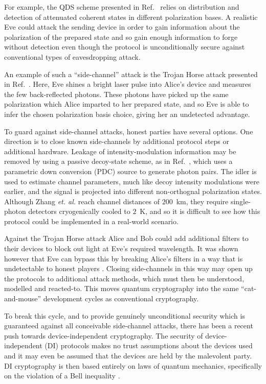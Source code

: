 For example, the QDS scheme presented in Ref.~\cite{Amiri2016} relies on distribution and detection of attenuated coherent states in different polarization bases. A realistic Eve could attack the sending device in order to gain information about the polarization of the prepared state and so gain enough information to forge without detection even though the protocol is unconditionally secure against conventional types of eavesdropping attack.

An example of such a ``side-channel'' attack is the Trojan Horse attack presented in Ref.~\cite{Jain2014}. Here, Eve shines a bright laser pulse into Alice's device and measures the few back-reflected photons. These photons have picked up the same polarization which Alice imparted to her prepared state, and so Eve is able to infer the chosen polarization basis choice, giving her an undetected advantage. %

To guard against side-channel attacks, honest parties have several options. One direction is to close known side-channels by additional protocol steps or additional hardware. Leakage of intensity-modulation information may be removed by using a passive decoy-state scheme, as in Ref.~\cite{Zhang2018b}, which uses a parametric down conversion (PDC) source to generate photon pairs. The idler is used to estimate channel parameters, much like decoy intensity modulations were earlier, and the signal is projected into different non-orthognal polarization states. Although Zhang \emph{et. al.} reach channel distances of $200$~km, they require single-photon detectors cryogenically cooled to $2$~K, and so it is difficult to see how this protocol could be implemented in a real-world scenario.


Against the Trojan Horse attack Alice and Bob could add additional filters to their devices to block out light at Eve's required wavelength. It was shown however that Eve can bypass this by breaking Alice's filters in a way that is undetectable to honest players \cite{Sajeed2016}. Closing side-channels in this way may open up the protocols to additional attack methods, which must then be understood, modelled and reacted-to. This moves quantum cryptography into the same ``cat-and-mouse'' development cycles as conventional cryptography. 

To break this cycle, and to provide genuinely unconditional security which is guaranteed against all conceivable side-channel attacks, there has been a recent push towards device-independent cryptography. The security of device-independent (DI) protocols makes no trust assumptions about the devices used and it may even be assumed that the  devices are held by the malevolent party. DI cryptography is then based entirely on laws of quantum mechanics, specifically on the violation of a Bell inequality \cite{Vazirani2014, Pironio2009, Colbeck2009}. 

